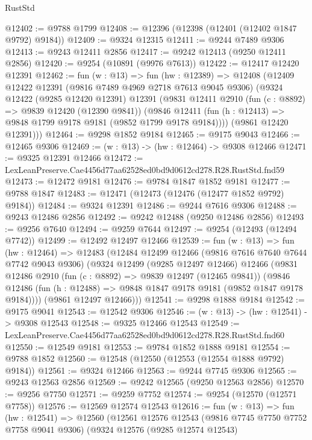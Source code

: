 \begin{lexlean}{RustStd}
\begin{coremodule}
@12402 := @9788 @1799
@12408 := @12396 (@12398 (@12401 (@12402 @1847 @9792) @9184))
@12409 := @9324 @12315
@12411 := @9244 @7489 @9306
@12413 := @9243 @12411 @2856
@12417 := @9242 @12413 (@9250 @12411 @2856)
@12420 := @9254 (@10891 (@9976 @7613))
@12422 := @12417 @12420 @12391
@12462 := fun (w : @13) =>
  fun (hw : @12389) =>
  @12408
    (@12409
      @12422
      @12391
      (@9816 @7489 @4969 @2718 @7613 @9045 @9306)
      (@9324
        @12422
        (@9285 @12420 @12391)
        @12391
        (@9831
          @12411
          @2910
          (fun (c : @8892) => @9839 @12420 (@12390 @9841))
          (@9846 @12411 (fun (h : @12413) => @9848 @1799 @9178 @9181 (@9852 @1799 @9178 @9184))))
        (@9861 @12420 @12391)))
@12464 := @9298 @1852 @9184
@12465 := @9175 @9043
@12466 := @12465 @9306
@12469 := (w : @13) -> (hw : @12464) -> @9308 @12466
@12471 := @9325 @12391 @12466
@12472 := LexLeanPreserve.Cae4456d77aa62528ed0bd9d0612cd278.R28.RustStd.fnd59
@12473 := @12472 @9181
@12476 := @9784 @1847 @1852 @9181
@12477 := @9788 @1847
@12483 := @12471 (@12473 (@12476 (@12477 @1852 @9792) @9184))
@12484 := @9324 @12391
@12486 := @9244 @7616 @9306
@12488 := @9243 @12486 @2856
@12492 := @9242 @12488 (@9250 @12486 @2856)
@12493 := @9256 @7640
@12494 := @9259 @7644
@12497 := @9254 (@12493 (@12494 @7742))
@12499 := @12492 @12497 @12466
@12539 := fun (w : @13) =>
  fun (hw : @12464) =>
  @12483
    (@12484
      @12499
      @12466
      (@9816 @7616 @7640 @7644 @7742 @9043 @9306)
      (@9324
        @12499
        (@9285 @12497 @12466)
        @12466
        (@9831
          @12486
          @2910
          (fun (c : @8892) => @9839 @12497 (@12465 @9841))
          (@9846 @12486 (fun (h : @12488) => @9848 @1847 @9178 @9181 (@9852 @1847 @9178 @9184))))
        (@9861 @12497 @12466)))
@12541 := @9298 @1888 @9184
@12542 := @9175 @9041
@12543 := @12542 @9306
@12546 := (w : @13) -> (hw : @12541) -> @9308 @12543
@12548 := @9325 @12466 @12543
@12549 := LexLeanPreserve.Cae4456d77aa62528ed0bd9d0612cd278.R28.RustStd.fnd60
@12550 := @12549 @9181
@12553 := @9784 @1852 @1888 @9181
@12554 := @9788 @1852
@12560 := @12548 (@12550 (@12553 (@12554 @1888 @9792) @9184))
@12561 := @9324 @12466
@12563 := @9244 @7745 @9306
@12565 := @9243 @12563 @2856
@12569 := @9242 @12565 (@9250 @12563 @2856)
@12570 := @9256 @7750
@12571 := @9259 @7752
@12574 := @9254 (@12570 (@12571 @7758))
@12576 := @12569 @12574 @12543
@12616 := fun (w : @13) =>
  fun (hw : @12541) =>
  @12560
    (@12561
      @12576
      @12543
      (@9816 @7745 @7750 @7752 @7758 @9041 @9306)
      (@9324
        @12576
        (@9285 @12574 @12543)

\end{coremodule}
\end{lexlean}
